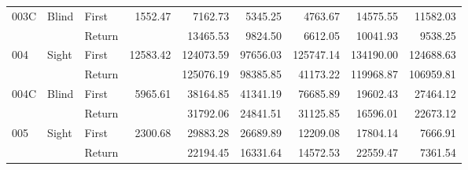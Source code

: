 \begin{table}[!htb]
\begin{tabular}{lllrrrrrr}
003C & Blind & First &   1552.47 &    7162.73 &    5345.25 &                                               4763.67 &                                               14575.55 &   11582.03 \\
    &       & Return &           &   13465.53 &    9824.50 &                                               6612.05 &                                               10041.93 &    9538.25 \\
004 & Sight & First &  12583.42 &  124073.59 &   97656.03 &                                             125747.14 &                                              134190.00 &  124688.63 \\
    &       & Return &           &  125076.19 &   98385.85 &                                              41173.22 &                                              119968.87 &  106959.81 \\
004C & Blind & First &   5965.61 &   38164.85 &   41341.19 &                                              76685.89 &                                               19602.43 &   27464.12 \\
    &       & Return &           &   31792.06 &   24841.51 &                                              31125.85 &                                               16596.01 &   22673.12 \\
005 & Sight & First &   2300.68 &   29883.28 &   26689.89 &                                              12209.08 &                                               17804.14 &    7666.91 \\
    &       & Return &           &   22194.45 &   16331.64 &                                              14572.53 &                                               22559.47 &    7361.54 \\
\bottomrule
\end{tabular}
\end{table}

